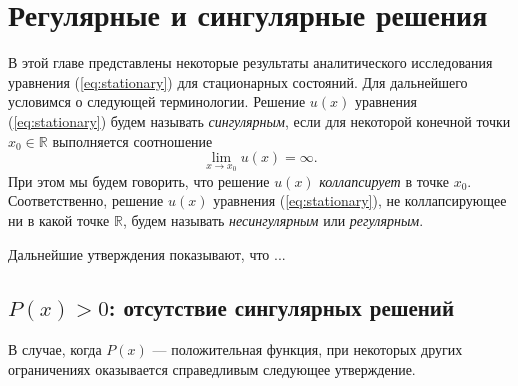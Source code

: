 \chapter{Регулярные и сингулярные решения}

В этой главе представлены некоторые результаты аналитического исследования уравнения (\ref{eq:stationary}) для стационарных состояний.
Для дальнейшего условимся о следующей терминологии.
Решение $u(x)$ уравнения (\ref{eq:stationary}) будем называть {\it сингулярным}, если для некоторой конечной точки $x_0 \in \mathbb{R}$ выполняется соотношение
%
$$\lim \limits_{x \to x_0} u(x) = \infty.$$
%
При этом мы будем говорить, что решение $u(x)$ {\it коллапсирует} в точке $x_0$.
Соответственно, решение $u(x)$ уравнения (\ref{eq:stationary}), не коллапсирующее ни в какой точке $\mathbb{R}$, будем называть {\it несингулярным} или {\it регулярным}.

Дальнейшие утверждения показывают, что ...

\section{$P(x) > 0$: отсутствие сингулярных решений}

В случае, когда $P(x)$ --- положительная функция, при некоторых других ограничениях оказывается справедливым следующее утверждение.

